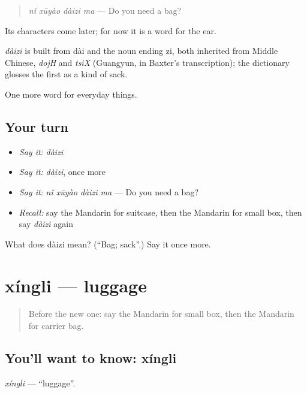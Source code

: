 \begin{quote}
\emph{nǐ xūyào dàizi ma} — Do you need a bag?
\end{quote}

Its characters come later; for now it is a word for the ear.

\begin{cousinweb}
\emph{dàizi} is built from dài and the noun ending zi, both inherited from Middle Chinese, \emph{dojH} and \emph{tsiX} (Guangyun, in Baxter's transcription); the dictionary glosses the first as a kind of sack.
\end{cousinweb}

\begin{grammarlens}[title={What you've built}]
One more word for everyday things.
\end{grammarlens}

\subsection*{Your turn}
\begin{itemize}
\raggedright
  \item \emph{Say it:} \emph{dàizi}
  \item \emph{Say it:} \emph{dàizi}, once more
  \item \emph{Say it:} \emph{nǐ xūyào dàizi ma} — Do you need a bag?
  \item \emph{Recall:} say the Mandarin for suitcase, then the Mandarin for small box, then say \emph{dàizi} again
\end{itemize}

\begin{tcolorbox}[breakable,colback=teal!4,colframe=teal!35!black,title={Before you move on}]
What does dàizi mean? (\textquotedblleft{}Bag; sack\textquotedblright{}.) Say it once more.
\end{tcolorbox}
\section[xíngli]{xíngli — luggage}

\label{lesson:ZH-C119-xingli}



\begin{quote}
Before the new one: say the Mandarin for small box, then the Mandarin for carrier bag.
\end{quote}

\subsection*{You'll want to know: xíngli}
\emph{xíngli} — \textquotedblleft{}luggage\textquotedblright{}.

